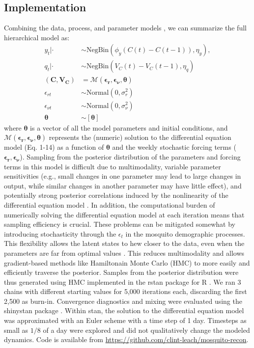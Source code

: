 \documentclass[10pt,letterpaper]{article}
\begin{document}
\subsection*{Implementation}

Combining the data, process, and parameter models \cite{Berliner1996}, we can summarize the full hierarchical model as:
\begin{align}
y_t | \cdot & \sim \text{NegBin}(\phi_y (C(t) - C(t-1)), \eta_y),
\\
q_t | \cdot &\sim \text{NegBin}(V_{C}(t) - V_{C}(t-1), \eta_q)\\
(\mathbf{C}, \mathbf{V_C}) & = \mathcal{M}(\boldsymbol{\epsilon_r}, \boldsymbol{\epsilon_{\nu}},\boldsymbol{\theta})\\
\epsilon_{rt} & \sim \text{Normal}(0, \sigma^2_r)\\
\epsilon_{\nu t} & \sim \text{Normal}(0, \sigma^2_{\nu})\\
\boldsymbol{\theta} & \sim [\boldsymbol{\theta}]
\end{align}
where $\boldsymbol{\theta}$ is a vector of all the model parameters and initial conditions, and $\mathcal{M}(\boldsymbol{\epsilon_r}, \boldsymbol{\epsilon_{\nu}},\boldsymbol{\theta})$ represents the (numeric) solution to the differential equation model (Eq. 1-14) as a function of $\boldsymbol{\theta}$ and the weekly stochastic forcing terms ($\boldsymbol{\epsilon_{r}}, \boldsymbol{\epsilon_{\nu}}$).
Sampling from the posterior distribution of the parameters and forcing terms in this model is difficult due to multimodality, variable parameter sensitivities (e.g., small changes in one parameter may lead to large changes in output, while similar changes in another parameter may have little effect), and potentially strong posterior correlations induced by the nonlinearity of the differential equation model \cite{Reilly2005, Girolami2008, Calderhead2011}.
In addition, the computational burden of numerically solving the differential equation model at each iteration means that sampling efficiency is crucial.
These problems can be mitigated somewhat by introducing stochasticity through the $\epsilon_t$ in the mosquito demographic processes.
This flexibility allows the latent states to hew closer to the data, even when the parameters are far from optimal values \cite{Leander2014}.
This reduces multimodality and allows gradient-based methods like Hamiltonain Monte Carlo (HMC) to more easily and efficiently traverse the posterior.
Samples from the posterior distribution were thus generated using HMC implemented in the rstan package \cite{Carpenter2016, Rstan2017} for R \cite{R2016}. 
We ran 3 chains with different starting values for 5,000 iterations each, discarding the first 2,500 as burn-in.
Convergence diagnostics and mixing were evaluated using the shinystan package \cite{shinystan}.
Within stan, the solution to the differential equation model was approximated with an Euler scheme with a time step of 1 day.  
Timesteps as small as $1/8$ of a day were explored and did not qualitatively change the modeled dynamics.
Code is available from \href{https://github.com/clint-leach/mosquito-recon}{https://github.com/clint-leach/mosquito-recon}.
\end{document}
